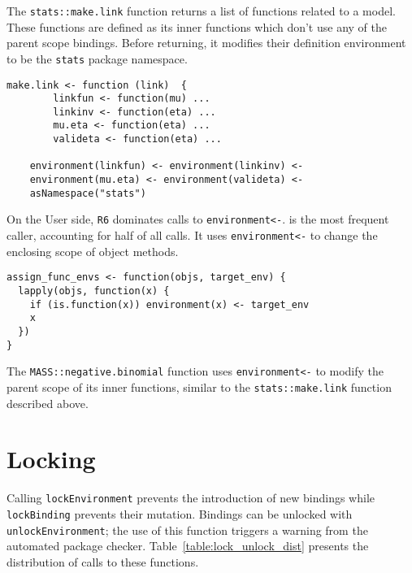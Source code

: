 \documentclass[10pt,sigplan,authorversion=true]{acmart}
\renewcommand{\c}[1]{\lstinline |#1|\xspace}
\begin{document}
The \c{stats::make.link} function returns a list of functions related to
a model. These functions are defined as its inner functions which don't use any
of the parent scope bindings. Before returning, it modifies their definition
environment to be the \c{stats} package namespace.

\begin{lstlisting}
make.link <- function (link)  {
        linkfun <- function(mu) ...
        linkinv <- function(eta) ...
        mu.eta <- function(eta) ...
        valideta <- function(eta) ... 

    environment(linkfun) <- environment(linkinv) <-
    environment(mu.eta) <- environment(valideta) <-
    asNamespace("stats")
\end{lstlisting}\medskip

On the {User} side, \c{R6} dominates calls to \c{environment<-}.
\EnvAsnOneCallerName is the most frequent caller, accounting for half of all
calls. It uses \c{environment<-} to change the enclosing scope of object
methods.

\begin{lstlisting}
assign_func_envs <- function(objs, target_env) {
  lapply(objs, function(x) {
    if (is.function(x)) environment(x) <- target_env
    x
  })
}
\end{lstlisting}\medskip


The \c{MASS::negative.binomial} function uses \c{environment<-} to modify the
parent scope of its inner functions, similar to the \c{stats::make.link}
function described above.

\section{Locking}

Calling \c{lockEnvironment} prevents the introduction of new bindings while
\c{lockBinding} prevents their mutation. Bindings can be unlocked with
\c{unlockEnvironment}; the use of this function triggers a warning from the
automated package checker. Table~\ref{table:lock_unlock_dist} presents the
distribution of calls to these functions.
\end{document}
